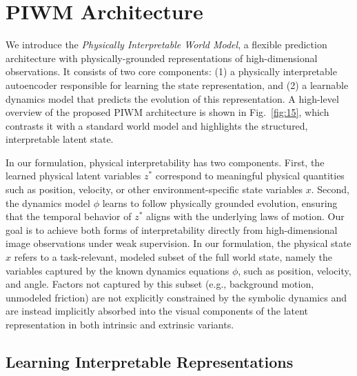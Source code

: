 \documentclass[nonacm,sigconf]{acmart}
\begin{document}


\section{PIWM Architecture}\label{sec:architecture}

We introduce the \textit{Physically Interpretable World Model}, a flexible prediction architecture with physically-grounded representations of high-dimensional observations. It consists of two core components: (1) a {physically interpretable autoencoder} responsible for learning the state representation, and (2) a {learnable dynamics model} that predicts the evolution of this representation. A high-level overview of the proposed PIWM architecture is shown in Fig.~\ref{fig:15}, which contrasts it with a standard world model and highlights the structured, interpretable latent state. 

In our formulation, physical interpretability has two components. 
First, the learned physical latent variables $z^*$ correspond to meaningful physical quantities such as position, velocity, or other environment-specific state variables $x$. 
Second, the dynamics model $\phi$ learns to follow physically grounded evolution, ensuring that the temporal behavior of $z^*$ aligns with the underlying laws of motion. 
Our goal is to achieve both forms of interpretability directly from high-dimensional image observations under weak supervision. In our formulation, the physical state $x$ refers to a task-relevant, modeled subset of the full world state, namely the variables captured by the known dynamics equations $\phi$, such as position, velocity, and angle. Factors not captured by this subset (e.g., background motion, unmodeled friction) are not explicitly constrained by the symbolic dynamics and are instead implicitly absorbed into the visual components of the latent representation in both intrinsic and extrinsic variants.

\subsection{Learning Interpretable Representations}
\end{document}
